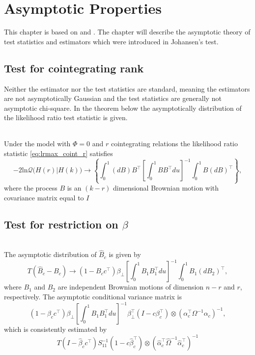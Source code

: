 \chapter{Asymptotic Properties}
This chapter is based on \cite{Statistica_analysis_of_cointegrating_vectors} and \cite{Modelling_of_cointegration_in_the_vector_autoregressive_model}. The chapter will describe the asymptotic theory of test statistics and estimators which were introduced in Johansen's test.

\section{Test for cointegrating rank}
Neither the estimator nor the test statistics are standard, meaning the estimators are not asymptotically Gaussian and the test statistics are generally not asymptotic chi-square. In the theorem below the asymptotically distribution of the likelihood ratio test statistic is given.

\begin{thm}\phantom\\
    Under the model with $\Phi=0$ and $r$ cointegrating relations the likelihood ratio statistic \eqref{eq:lrmax_coint_r} satisfies
    \begin{equation*}
        -2 \text{ln}\mathcal{Q} \big( H(r)|H(k) \big) \rightarrow \left\{ \int_0^1 (dB)B^{\top} \left[\int_0^1 BB^\top du \right]^{-1} \int_0^1 B(dB)^\top \right\},
    \end{equation*}
    where the process $B$ is an $(k-r)$ dimensional Brownian motion with covariance matrix equal to $I$
\end{thm}



\section{Test for restriction on $\beta$}
\begin{thm}\phantom\\
The asymptotic distribution of $\hat{B}_c$ is given by 
\begin{equation*}
    T(\hat{B}_c-B_c) \rightarrow (1-B_c c^\top) \beta_\perp \left[ \int_0^1 B_1 B_1^\top du \right]^{-1} \int_0^1 B_1(dB_2)^\top,
\end{equation*}
    where $B_1$ and $B_2$ are independent Brownian motions of dimension $n-r$ and $r$, respectively. The asymptotic conditional variance matrix is 
    \begin{equation*}
        (1-\beta_c c^\top) \beta_\perp \left[\int_0^1 B_1B_1^\top du \right]^{-1} \beta_\perp^\top (I-c\beta_c^\top ) \otimes (\alpha_c^\top \Omega^{-1}\alpha_c)^{-1},
    \end{equation*}
    which is consistently estimated by
    \begin{equation*}
        T(I-\hat{\beta}_c c^\top)S_{11}^{-1}(1-c\hat{\beta}_c^\top) \otimes (\hat{\alpha}_c^\top \hat{\Omega}^{-1}\hat{\alpha}_c^\top)^{-1}
    \end{equation*}
\end{thm}

